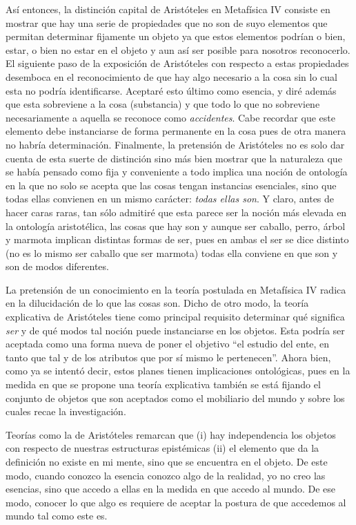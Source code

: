 \documentclass[]{book}
\begin{document}
\begin{refsection}
Así entonces, la distinción capital de Aristóteles en Metafísica IV
consiste en mostrar que hay una serie de propiedades que no son de suyo
elementos que permitan determinar fijamente un objeto ya que estos
elementos podrían o bien, estar, o bien no estar en el objeto y aun así
ser posible para nosotros reconocerlo. El siguiente paso de la
exposición de Aristóteles con respecto a estas propiedades desemboca en
el reconocimiento de que hay algo necesario a la cosa sin lo cual esta
no podría identificarse. Aceptaré esto último como esencia, y diré
además que esta sobreviene a la cosa (substancia) y que todo lo que no
sobreviene necesariamente a aquella se reconoce como \emph{accidentes}.
Cabe recordar que este elemento debe instanciarse de forma permanente en
la cosa pues de otra manera no habría determinación. Finalmente, la
pretensión de Aristóteles no es solo dar cuenta de esta suerte de
distinción sino más bien mostrar que la naturaleza que se había pensado
como fija y conveniente a todo implica una noción de ontología en la que
no solo se acepta que las cosas tengan instancias esenciales, sino que
todas ellas convienen en un mismo carácter: \emph{todas ellas son}. Y
claro, antes de hacer caras raras, tan sólo admitiré que esta parece ser
la noción más elevada en la ontología aristotélica, las cosas que hay
son y aunque ser caballo, perro, árbol y marmota implican distintas
formas de ser, pues en ambas el ser se dice distinto (no es lo mismo ser
caballo que ser marmota) todas ella conviene en que son y son de modos
diferentes.

La pretensión de un conocimiento en la teoría postulada en Metafísica IV
radica en la dilucidación de lo que las cosas son. Dicho de otro modo,
la teoría explicativa de Aristóteles tiene como principal requisito
determinar qué significa \emph{ser} y de qué modos tal noción puede
instanciarse en los objetos. Esta podría ser aceptada como una forma
nueva de poner el objetivo ``el estudio del ente, en tanto que tal y de
los atributos que por sí mismo le pertenecen''. Ahora bien, como ya se
intentó decir, estos planes tienen implicaciones ontológicas, pues en la
medida en que se propone una teoría explicativa también se está fijando
el conjunto de objetos que son aceptados como el mobiliario del mundo y
sobre los cuales recae la investigación.

Teorías como la de Aristóteles remarcan que (i) hay independencia los
objetos con respecto de nuestras estructuras epistémicas (ii) el
elemento que da la definición no existe en mi mente, sino que se
encuentra en el objeto. De este modo, cuando conozco la esencia conozco
algo de la realidad, yo no creo las esencias, sino que accedo a ellas en
la medida en que accedo al mundo. De ese modo, conocer lo que algo es
requiere de aceptar la postura de que accedemos al mundo tal como este
es.


\end{refsection}
\end{document}
